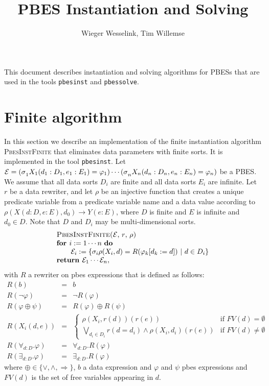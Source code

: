 \documentclass{article}
\newcommand{\For}{\text{\textbf{for }}}
\newcommand{\Return}{\text{\textbf{return }}}
\begin{document}
\title{PBES Instantiation and Solving}
\author{Wieger Wesselink, Tim Willemse}
\maketitle

This document describes instantiation and solving algorithms for PBESs that
are used in the tools \texttt{pbesinst} and \texttt{pbessolve}.

\section{Finite algorithm}

In this section we describe an implementation of the finite instantiation
algorithm \textsc{PbesInstFinite} that eliminates data parameters with
finite sorts. It is implemented in the tool \texttt{pbesinst}. Let $\mathcal{%
E=(\sigma }_{1}X_{1}(d_{1}:D_{1},e_{1}:E_{1})=\varphi _{1})\cdots \mathcal{%
(\sigma }_{n}X_{n}(d_{n}:D_{n},e_{n}:E_{n})=\varphi _{n})$ be a PBES. We
assume that all data sorts $D_{i}$ are finite and all data sorts $E_{i}$ are
infinite. Let $r$ be a data rewriter, and let $\rho $ be an injective
function that creates a unique predicate variable from a predicate variable
name and a data value according to $\rho (X(d:D,e:E),d_{0})\rightarrow Y(e:E)
$, where $D$ is finite and $E$ is infinite and $d_{0}\in D$. Note that $D$
and $D_{i}$ may be multi-dimensional sorts.%
\begin{equation*}
\begin{array}{l}
\text{\textsc{PbesInstFinite(}}\mathcal{E}\text{, }r\text{, }\rho \text{%
\textsc{)}} \\
\For i:=1\cdots n\text{ \textbf{do}} \\
\qquad \mathcal{E}_{i}:=\{\mathcal{\sigma }_{i}\rho (X_{i},d)=R(\varphi
_{k}[d_{k}:=d])\ |\ d\in D_{i}\} \\
\Return \mathcal{E}_{1}\cdots \mathcal{E}_{n},%
\end{array}%
\end{equation*}%
with $R$ a rewriter on pbes expressions that is defined as follows:%
\begin{eqnarray*}
R(b) &=&b \\
R(\lnot \varphi ) &=&\lnot R(\varphi ) \\
R(\varphi \oplus \psi ) &=&R(\varphi )\oplus R(\psi ) \\
R(X_{i}(d,e)) &=&\left\{
\begin{array}{cc}
\rho (X_{i},r(d))(r(e)) & \text{if }FV(d)=\emptyset  \\
\bigvee\limits_{d_{i}\in D_{i}}r(d=d_{i})\wedge \rho (X_{i},d_{i})(r(e)) &
\text{if }FV(d)\neq \emptyset
\end{array}%
\right.  \\
R(\forall _{d:D}.\varphi ) &=&\forall _{d:D}.R(\varphi ) \\
R(\exists _{d:D}.\varphi ) &=&\exists _{d:D}.R(\varphi )
\end{eqnarray*}%
where $\oplus \in \{\vee ,\wedge ,\Rightarrow \}$, $b$ a data expression and
$\varphi $ and $\psi $ pbes expressions and $FV(d)$ is the set of free
variables appearing in $d$.\newpage
\end{document}

